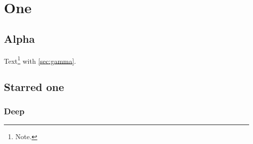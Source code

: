 \chapter{One}\label{ch:one}
\section{Alpha}\label{sec:alpha}
Text\footnote{Note.} with \autoref{sec:gamma}.
\section*{Starred one}
\subsection{Deep}\label{sub:deep}
